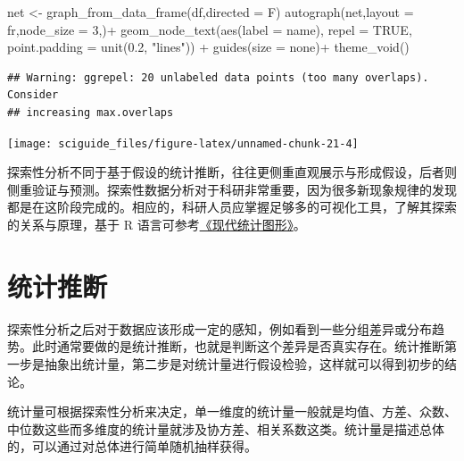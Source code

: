 \documentclass[]{tufte-book}
\newenvironment{Shaded}{}{}
\newcommand{\AttributeTok}[1]{\textcolor[rgb]{0.49,0.56,0.16}{#1}}
\newcommand{\ConstantTok}[1]{\textcolor[rgb]{0.53,0.00,0.00}{#1}}
\newcommand{\DecValTok}[1]{\textcolor[rgb]{0.25,0.63,0.44}{#1}}
\newcommand{\FloatTok}[1]{\textcolor[rgb]{0.25,0.63,0.44}{#1}}
\newcommand{\FunctionTok}[1]{\textcolor[rgb]{0.02,0.16,0.49}{#1}}
\newcommand{\NormalTok}[1]{#1}
\newcommand{\OtherTok}[1]{\textcolor[rgb]{0.00,0.44,0.13}{#1}}
\newcommand{\SpecialCharTok}[1]{\textcolor[rgb]{0.25,0.44,0.63}{#1}}
\newcommand{\StringTok}[1]{\textcolor[rgb]{0.25,0.44,0.63}{#1}}
\begin{document}
\begin{Shaded}
\begin{Highlighting}[]
\NormalTok{net }\OtherTok{\textless{}{-}} \FunctionTok{graph\_from\_data\_frame}\NormalTok{(df,}\AttributeTok{directed =}\NormalTok{ F)}
\FunctionTok{autograph}\NormalTok{(net,}\AttributeTok{layout =} \StringTok{\textquotesingle{}fr\textquotesingle{}}\NormalTok{,}\AttributeTok{node\_size =} \DecValTok{3}\NormalTok{,)}\SpecialCharTok{+}
        \FunctionTok{geom\_node\_text}\NormalTok{(}\FunctionTok{aes}\NormalTok{(}\AttributeTok{label =}\NormalTok{ name), }\AttributeTok{repel =} \ConstantTok{TRUE}\NormalTok{, }
                 \AttributeTok{point.padding =} \FunctionTok{unit}\NormalTok{(}\FloatTok{0.2}\NormalTok{, }\StringTok{"lines"}\NormalTok{)) }\SpecialCharTok{+}
        \FunctionTok{guides}\NormalTok{(}\AttributeTok{size =} \StringTok{\textquotesingle{}none\textquotesingle{}}\NormalTok{)}\SpecialCharTok{+}
        \FunctionTok{theme\_void}\NormalTok{()}
\end{Highlighting}
\end{Shaded}

\begin{verbatim}
## Warning: ggrepel: 20 unlabeled data points (too many overlaps). Consider
## increasing max.overlaps
\end{verbatim}

\texttt{[image: sciguide\_files/figure-latex/unnamed-chunk-21-4]}

探索性分析不同于基于假设的统计推断，往往更侧重直观展示与形成假设，后者则侧重验证与预测。探索性数据分析对于科研非常重要，因为很多新现象规律的发现都是在这阶段完成的。相应的，科研人员应掌握足够多的可视化工具，了解其探索的关系与原理，基于 R 语言可参考\href{https://bookdown.org/xiangyun/msg/}{《现代统计图形》}。

\hypertarget{ux7edfux8ba1ux63a8ux65ad}{%
\section{统计推断}\label{ux7edfux8ba1ux63a8ux65ad}}

探索性分析之后对于数据应该形成一定的感知，例如看到一些分组差异或分布趋势。此时通常要做的是统计推断，也就是判断这个差异是否真实存在。统计推断第一步是抽象出统计量，第二步是对统计量进行假设检验，这样就可以得到初步的结论。

统计量可根据探索性分析来决定，单一维度的统计量一般就是均值、方差、众数、中位数这些而多维度的统计量就涉及协方差、相关系数这类。统计量是描述总体的，可以通过对总体进行简单随机抽样获得。
\end{document}
